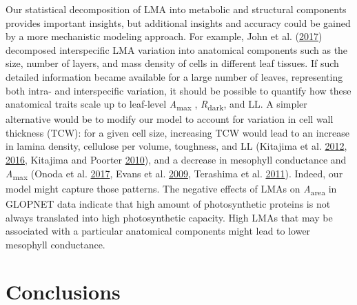 \documentclass[
  12pt,
]{article}
\begin{document}
Our statistical decomposition of LMA into metabolic and structural components provides important insights, but additional insights and accuracy could be gained by a more mechanistic modeling approach.
For example, John et al. (\protect\hyperlink{ref-John2017}{2017}) decomposed interspecific LMA variation into anatomical components such as the size, number of layers, and mass density of cells in different leaf tissues.
If such detailed information became available for a large number of leaves, representing both intra- and interspecific variation, it should be possible to quantify how these anatomical traits scale up to leaf-level \emph{A}\textsubscript{max} , \emph{R}\textsubscript{dark}, and LL.
A simpler alternative would be to modify our model to account for variation in cell wall thickness (TCW): for a given cell size, increasing TCW would lead to an increase in lamina density, cellulose per volume, toughness, and LL (Kitajima et al. \protect\hyperlink{ref-Kitajima2012}{2012}, \protect\hyperlink{ref-Kitajima2016}{2016}, Kitajima and Poorter \protect\hyperlink{ref-Kitajima2010}{2010}), and a decrease in mesophyll conductance and \emph{A}\textsubscript{max} (Onoda et al. \protect\hyperlink{ref-Onoda2017}{2017}, Evans et al. \protect\hyperlink{ref-Evans2009}{2009}, Terashima et al. \protect\hyperlink{ref-Terashima2011}{2011}).
Indeed, our model might capture those patterns. The negative effects of LMAs on \emph{A}\textsubscript{area} in GLOPNET data indicate that high amount of photosynthetic proteins is not always translated into high photosynthetic capacity.
High LMAs that may be associated with a particular anatomical components might lead to lower mesophyll conductance.

\hypertarget{conclusions}{%
\section{Conclusions}\label{conclusions}}
\end{document}

